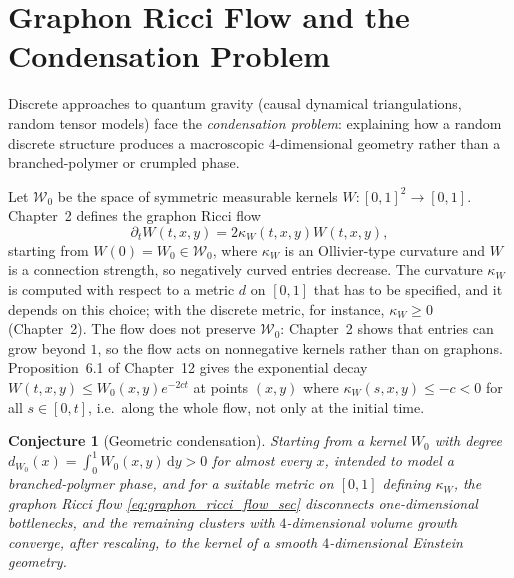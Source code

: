 \documentclass[11pt,a4paper,reqno]{amsart}
\newtheorem{conjecture}[theorem]{Conjecture}
\theoremstyle{definition}
\numberwithin{equation}{section}
\newcommand{\dif}{\,\mathrm{d}}
\providecommand{\xref}[2]{#2}
\begin{document}
\section{Graphon Ricci Flow and the Condensation Problem}
\label{sec:pre_geometry}

Discrete approaches to quantum gravity (causal dynamical triangulations, random tensor models) face the \emph{condensation problem}: explaining how a random discrete structure produces a macroscopic $4$-dimensional geometry rather than a branched-polymer or crumpled phase.

Let $\mathcal{W}_0$ be the space of symmetric measurable kernels $W \colon [0, 1]^2 \to [0, 1]$. Chapter~2 \cite{silvafilho2026flows} defines the graphon Ricci flow
\begin{equation}
    \label{eq:graphon_ricci_flow_sec}
    \partial_t W(t, x, y) = 2 \kappa_W(t, x, y) W(t, x, y),
\end{equation}
starting from $W(0) = W_0 \in \mathcal{W}_0$, where $\kappa_W$ is an Ollivier-type curvature \cite{ollivier2009ricci} and $W$ is a connection strength, so negatively curved entries decrease. The curvature $\kappa_W$ is computed with respect to a metric $d$ on $[0,1]$ that has to be specified, and it depends on this choice; with the discrete metric, for instance, $\kappa_W \ge 0$ (Chapter~2). The flow does not preserve $\mathcal{W}_0$: Chapter~2 shows that entries can grow beyond $1$, so the flow acts on nonnegative kernels rather than on graphons. Proposition~\xref{chap12:thm:neckpinch_condensation}{6.1} of Chapter~12 \cite{silvafilho2026grand} gives the exponential decay $W(t,x,y) \le W_0(x,y) e^{-2ct}$ at points $(x,y)$ where $\kappa_W(s,x,y) \le -c < 0$ for all $s \in [0,t]$, i.e.\ along the whole flow, not only at the initial time.

\begin{conjecture}[Geometric condensation]
\label{thm:geometric_condensation}
Starting from a kernel $W_0$ with degree $d_{W_0}(x) = \int_0^1 W_0(x,y)\dif y > 0$ for almost every $x$, intended to model a branched-polymer phase, and for a suitable metric on $[0,1]$ defining $\kappa_W$, the graphon Ricci flow \eqref{eq:graphon_ricci_flow_sec} disconnects one-dimensional bottlenecks, and the remaining clusters with $4$-dimensional volume growth converge, after rescaling, to the kernel of a smooth $4$-dimensional Einstein geometry.
\end{conjecture}
\end{document}
